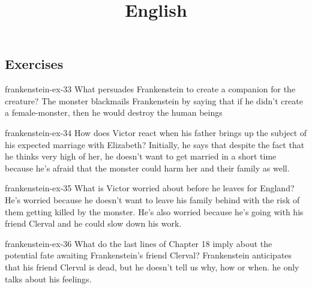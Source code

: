 \documentclass[preview]{standalone}
\begin{document}
\title{English}
\genpage

\subsection{Exercises}

\begin{snippetexercise}{frankenstein-ex-33}
    {What persuades Frankenstein to create a companion for the creature?}
    The monster blackmails Frankenstein by saying that if he didn't create a female-monster,
    then he would destroy the human beings 
\end{snippetexercise}

\begin{snippetexercise}{frankenstein-ex-34}
    {How does Victor react when his father brings up the subject of his expected marriage with
    Elizabeth?}
    Initially, he says that despite the fact that he thinks very high of her, he doesn't want
    to get married in a short time because he's afraid that the monster could 
    harm her and their family as well.
\end{snippetexercise}

\begin{snippetexercise}{frankenstein-ex-35}
    {What is Victor worried about before he leaves for England?}
    He's worried because he doesn't want to leave his family behind
    with the risk of them getting killed by the monster.
    He's also worried because he's going with his friend Clerval and he could 
    slow down his work.
\end{snippetexercise}

\begin{snippetexercise}{frankenstein-ex-36}
    {What do the last lines of Chapter 18 imply about the potential fate awaiting Frankenstein's friend
    Clerval?}
    Frankenstein anticipates that his friend Clerval is dead, but he doesn't tell us why,
    how or when. he only talks about his feelings. 
\end{snippetexercise}
\end{document}
